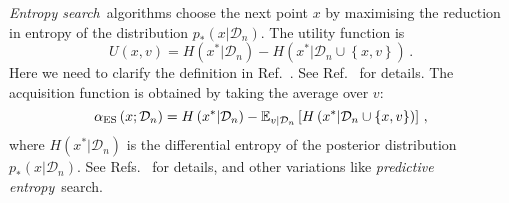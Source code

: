 {\em Entropy search}\ algorithms choose the next point $x$ by maximising the
reduction in entropy of the distribution $p_*(x|\mathcal{D}_n)$. The utility
function is 
\begin{equation}
    \label{eq:ESUtil}
    U(x,v) = H\left(x^*|\mathcal{D}_n\right) - 
    H\left(x^*|\mathcal{D}_n \cup \left\{x,v\right\}\right)\, .
\end{equation}
Here we need to clarify the definition in Ref.~\cite{shahriari2015taking}. See
Ref.~\cite{hernandez2014predictive} for details. The acquisition function is
obtained by taking the average over $v$: 
\begin{equation}
    \label{eq:ESAcq}
    \alpha_\mathrm{ES}\left(x;\mathcal{D}_n\right) = 
    H\left(x^*|\mathcal{D}_n\right) - 
    \mathbb{E}_{v|\mathcal{D}_n}\left[H\left(x^*|\mathcal{D}_n \cup \left\{x,v\right\}\right)\right]\, ,
\end{equation}
where $H\left(x^*|\mathcal{D}_n\right)$ is the differential entropy of the
posterior distribution $p_*(x|\mathcal{D}_n)$. See
Refs.~\cite{hennig2012entropy,villemonteix2009informational} for details, and
other variations like {\em predictive entropy}\ search. 